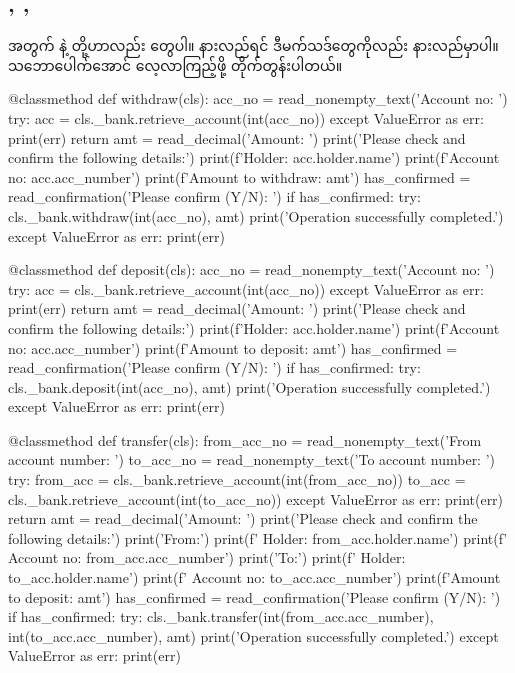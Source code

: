 \subsection*{, , }
 အတွက် \fEn{,}  နဲ့  တို့ဟာလည်း  တွေပါ။  နားလည်ရင် ဒီမက်သဒ်တွေကိုလည်း နားလည်မှာပါ။ သဘောပေါက်အောင် လေ့လာကြည့်ဖို့ တိုက်တွန်းပါတယ်။
%
\begin{py}
@classmethod
def withdraw(cls):
    acc_no = read_nonempty_text('Account no: ')
    try:
        acc = cls._bank.retrieve_account(int(acc_no))
    except ValueError as err:
        print(err)
        return
    amt = read_decimal('Amount: ')
    print('Please check and confirm the following details:')
    print(f'Holder: {acc.holder.name}')
    print(f'Account no: {acc.acc_number}')
    print(f'Amount to withdraw: {amt}')
    has_confirmed = read_confirmation('Please confirm (Y/N): ')
    if has_confirmed:
        try:
            cls._bank.withdraw(int(acc_no), amt)
            print('Operation successfully completed.')
        except ValueError as err:
            print(err)
\end{py}
%
\betweenminted{\medskipamount}
%
\begin{py}
@classmethod
def deposit(cls):
    acc_no = read_nonempty_text('Account no: ')
    try:
        acc = cls._bank.retrieve_account(int(acc_no))
    except ValueError as err:
        print(err)
        return
    amt = read_decimal('Amount: ')
    print('Please check and confirm the following details:')
    print(f'Holder: {acc.holder.name}')
    print(f'Account no: {acc.acc_number}')
    print(f'Amount to deposit: {amt}')
    has_confirmed = read_confirmation('Please confirm (Y/N): ')
    if has_confirmed:
        try:
            cls._bank.deposit(int(acc_no), amt)
            print('Operation successfully completed.')
        except ValueError as err:
            print(err)
\end{py}
%
\betweenminted{\medskipamount}
%
\begin{py}
@classmethod
def transfer(cls):
    from_acc_no = read_nonempty_text('From account number: ')
    to_acc_no = read_nonempty_text('To account number: ')
    try:
        from_acc = cls._bank.retrieve_account(int(from_acc_no))
        to_acc = cls._bank.retrieve_account(int(to_acc_no))
    except ValueError as err:
        print(err)
        return
    amt = read_decimal('Amount: ')
    print('Please check and confirm the following details:')
    print('From:')
    print(f'    Holder: {from_acc.holder.name}')
    print(f'    Account no: {from_acc.acc_number}')
    print('To:')
    print(f'    Holder: {to_acc.holder.name}')
    print(f'    Account no: {to_acc.acc_number}')
    print(f'Amount to deposit: {amt}')
    has_confirmed = read_confirmation('Please confirm (Y/N): ')
    if has_confirmed:
        try:
            cls._bank.transfer(int(from_acc.acc_number),
                                int(to_acc.acc_number),
                                amt)
            print('Operation successfully completed.')
        except ValueError as err:
            print(err)
\end{py}
%

